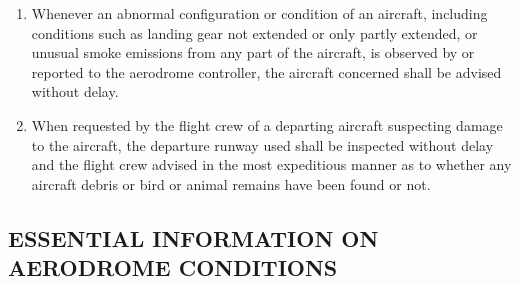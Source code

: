 \begin{enumeratesc}
    \begin{enumerate}
        \item Whenever an abnormal configuration or condition of an aircraft, including conditions such as landing gear not extended or only partly extended, or unusual smoke emissions from any part of the aircraft, is observed by or reported to the aerodrome controller, the aircraft concerned shall be advised without delay.
        \item When requested by the flight crew of a departing aircraft suspecting damage to the aircraft, the departure runway used shall be inspected without delay and the flight crew advised in the most expeditious manner as to whether any aircraft debris or bird or animal remains have been found or not.
    \end{enumerate}
\end{enumeratesc}

\subsection[Essential information on aerodrome conditions]{ESSENTIAL INFORMATION ON AERODROME CONDITIONS}


